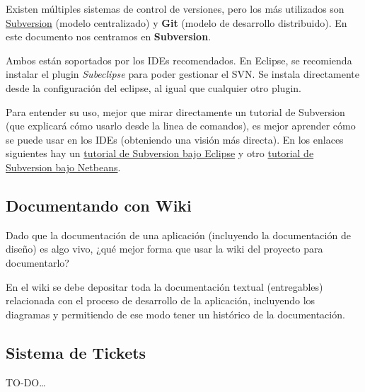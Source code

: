 \documentclass[11pt]{article}
\begin{document}
Existen múltiples sistemas de control de versiones, pero los más utilizados son
\href{http://www.subversion.org}{Subversion} (modelo centralizado) y 
\textbf{Git} (modelo de desarrollo distribuido). En este documento nos centramos en \textbf{Subversion}.

Ambos están soportados por los IDEs recomendados. En Eclipse, se recomienda instalar
el plugin \emph{Subeclipse} para poder gestionar el SVN. Se instala directamente desde la
configuración del eclipse, al igual que cualquier otro plugin.

Para entender su uso, mejor que mirar directamente un tutorial de Subversion
(que explicará cómo usarlo desde la linea de comandos), es mejor aprender cómo se
puede usar en los IDEs (obteniendo una visión más directa). En los enlaces
siguientes hay un \href{http://www.ibm.com/developerworks/opensource/library/os-ecl-subversion/}{tutorial
de Subversion bajo Eclipse} y otro \href{http://netbeans.org/kb/docs/ide/subversion.html}{tutorial de Subversion
bajo Netbeans}.

\subsection{Documentando con Wiki} \label{sec-7-3}

Dado que la documentación de una aplicación (incluyendo la documentación de
diseño) es algo vivo, ¿qué mejor forma que usar la wiki del proyecto para
documentarlo?

En el wiki se debe depositar toda la documentación textual (entregables) relacionada con el proceso de desarrollo de la aplicación, incluyendo los diagramas y permitiendo de ese modo
tener un histórico de la documentación.

\subsection{Sistema de Tickets}
\label{sec-7-4} \label{tickets}

TO-DO\ldots
\end{document}
